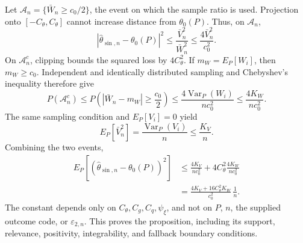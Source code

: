 Let \(\mathcal A_n=\{\bar W_n\ge c_0/2\}\), the event on which the sample ratio is used. Projection onto \([-C_{\theta},C_{\theta}]\) cannot increase distance from \(\theta_0(P)\). Thus, on \(\mathcal A_n\),
\[
|\widehat\theta_{\sin,n}-\theta_0(P)|^2
\le\frac{\bar V_n^2}{\bar W_n^2}
\le\frac{4\bar V_n^2}{c_0^2}.
\]
On \(\mathcal A_n^c\), clipping bounds the squared loss by \(4C_{\theta}^2\). If \(m_W=E_P[W_i]\), then \(m_W\ge c_0\). Independent and identically distributed sampling and Chebyshev's inequality therefore give
\[
P(\mathcal A_n^c)
\le P\!\left(|\bar W_n-m_W|\ge\frac{c_0}{2}\right)
\le\frac{4\operatorname{Var}_P(W_i)}{nc_0^2}
\le\frac{4K_W}{nc_0^2}.
\]
The same sampling condition and \(E_P[V_i]=0\) yield
\[
E_P[\bar V_n^2]
=\frac{\operatorname{Var}_P(V_i)}{n}
\le\frac{K_V}{n}.
\]
Combining the two events,
\[
\begin{aligned}
E_P[(\widehat\theta_{\sin,n}-\theta_0(P))^2]
&\le\frac{4K_V}{nc_0^2}
+4C_{\theta}^2\frac{4K_W}{nc_0^2}\\
&=\frac{4K_V+16C_{\theta}^2K_W}{c_0^2}\,\frac1n.
\end{aligned}
\]
The constant depends only on \(C_{\theta},C_g,C_q,\psi_{\xi}\), and not on \(P\), \(n\), the supplied outcome code, or \(\varepsilon_{2,n}\). This proves the proposition, including its support, relevance, positivity, integrability, and fallback boundary conditions.